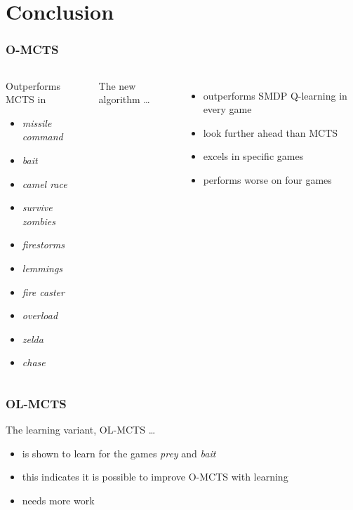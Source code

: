 \documentclass{beamer}
\begin{document}
\section{Conclusion}
\begin{frame}
	\frametitle{O-MCTS}
	\begin{columns}
		\begin{block}{Outperforms MCTS in}
			\begin{itemize}
				\item \textit{missile command}
				\item \textit{bait}
				\item \textit{camel race}
				\item \textit{survive zombies}
				\item \textit{firestorms}
				\item \textit{lemmings}
				\item \textit{fire caster}
				\item \textit{overload}
				\item \textit{zelda}
				\item \textit{chase}
			\end{itemize}
		\end{block}
		The new algorithm \ldots
			\begin{itemize}
				\item outperforms SMDP Q-learning in every game 
				\item look further ahead than MCTS
				\item excels in specific games
				\item performs worse on four games
			\end{itemize}
	\end{columns}
\end{frame}

\begin{frame}
	\frametitle{OL-MCTS}
	The learning variant, OL-MCTS \ldots
	\begin{itemize}
		\item is shown to learn for the games \textit{prey} and \textit{bait}
		\item this indicates it is possible to improve O-MCTS with learning
		\item needs more work
	\end{itemize}
\end{frame}
\end{document}
